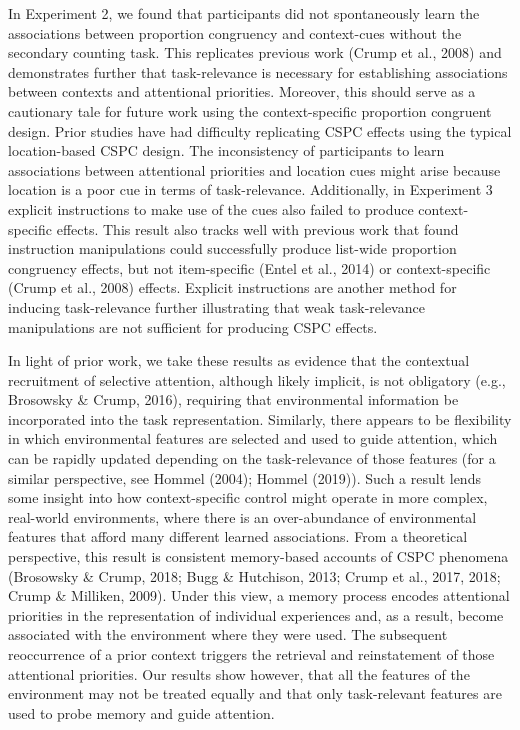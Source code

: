 \documentclass[english,,man,floatsintext]{apa6}
\begin{document}
In Experiment 2, we found that participants did not spontaneously learn the associations between proportion congruency and context-cues without the secondary counting task. This replicates previous work (Crump et al., 2008) and demonstrates further that task-relevance is necessary for establishing associations between contexts and attentional priorities. Moreover, this should serve as a cautionary tale for future work using the context-specific proportion congruent design. Prior studies have had difficulty replicating CSPC effects using the typical location-based CSPC design. The inconsistency of participants to learn associations between attentional priorities and location cues might arise because location is a poor cue in terms of task-relevance. Additionally, in Experiment 3 explicit instructions to make use of the cues also failed to produce context-specific effects. This result also tracks well with previous work that found instruction manipulations could successfully produce list-wide proportion congruency effects, but not item-specific (Entel et al., 2014) or context-specific (Crump et al., 2008) effects. Explicit instructions are another method for inducing task-relevance further illustrating that weak task-relevance manipulations are not sufficient for producing CSPC effects.

In light of prior work, we take these results as evidence that the contextual recruitment of selective attention, although likely implicit, is not obligatory (e.g., Brosowsky \& Crump, 2016), requiring that environmental information be incorporated into the task representation. Similarly, there appears to be flexibility in which environmental features are selected and used to guide attention, which can be rapidly updated depending on the task-relevance of those features (for a similar perspective, see Hommel (2004); Hommel (2019)). Such a result lends some insight into how context-specific control might operate in more complex, real-world environments, where there is an over-abundance of environmental features that afford many different learned associations. From a theoretical perspective, this result is consistent memory-based accounts of CSPC phenomena (Brosowsky \& Crump, 2018; Bugg \& Hutchison, 2013; Crump et al., 2017, 2018; Crump \& Milliken, 2009). Under this view, a memory process encodes attentional priorities in the representation of individual experiences and, as a result, become associated with the environment where they were used. The subsequent reoccurrence of a prior context triggers the retrieval and reinstatement of those attentional priorities. Our results show however, that all the features of the environment may not be treated equally and that only task-relevant features are used to probe memory and guide attention.
\end{document}
